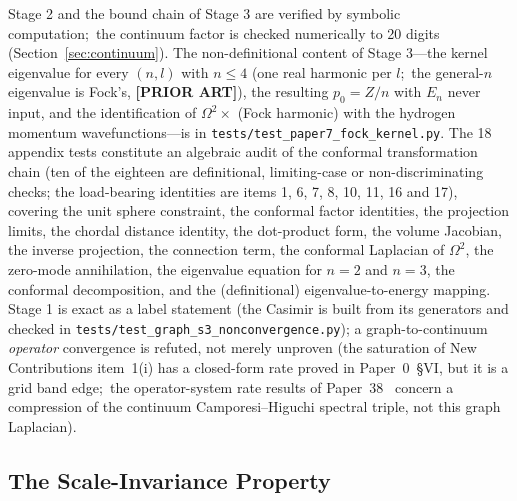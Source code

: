 \documentclass[aps,pra,twocolumn,superscriptaddress,longbibliography]{revtex4-2}
\newcommand{\gvc}[2]{#2}
\begin{document}
Stage 2 and the bound chain of Stage 3 are verified by symbolic computation;\ the continuum factor is checked numerically to 20 digits (Section~\ref{sec:continuum}). The non-definitional content of Stage 3---the kernel eigenvalue for every $(n,l)$ with $n \le 4$ (one real harmonic per $l$;\ the general-$n$ eigenvalue is Fock's, \textbf{[PRIOR ART]}), the resulting $p_0 = Z/n$ with $E_n$ never input, and the identification of $\Omega^2 \times$ (Fock harmonic) with the hydrogen momentum wavefunctions---is in \texttt{tests/test\_paper7\_fock\_kernel.py}. The 18 appendix tests constitute an algebraic audit of the conformal transformation chain (ten of the eighteen are definitional, limiting-case or non-discriminating checks; the load-bearing identities are items 1, 6, 7, 8, 10, 11, 16 and 17), covering the unit sphere constraint, the conformal factor identities, the projection limits, the chordal distance identity, the dot-product form, the volume Jacobian, the inverse projection, the connection term, the conformal Laplacian of $\Omega^2$, the zero-mode annihilation, the eigenvalue equation for $n = 2$ and $n = 3$, the conformal decomposition, and the (definitional) eigenvalue-to-energy mapping.  Stage 1 is exact as a label statement (the Casimir is built from its generators and checked in \texttt{tests/test\_graph\_s3\_nonconvergence.py}); \gvc{graph-s3-wall}{a graph-to-continuum \emph{operator} convergence is refuted, not merely unproven}
(the saturation of New Contributions item~1(i) has a closed-form rate proved in Paper~0~\S VI, but it is a grid band edge;\ the operator-system rate results of Paper~38~\cite{loutey_paper38} concern a compression of the continuum Camporesi--Higuchi spectral triple, not this graph Laplacian).

\subsection{The Scale-Invariance Property}
\end{document}
